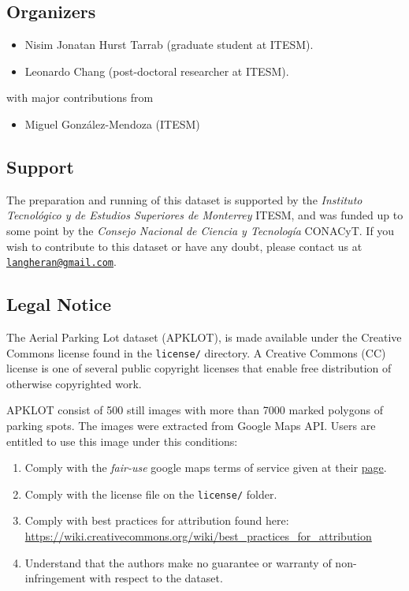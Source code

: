 \documentclass[]{article}
\providecommand{\tightlist}{%
  \setlength{\itemsep}{0pt}\setlength{\parskip}{0pt}}
\theoremstyle{definition}
\theoremstyle{definition}
\theoremstyle{definition}
\theoremstyle{remark}
\begin{document}
\hypertarget{organizers}{%
\subsection{Organizers}\label{organizers}}

\begin{itemize}
\tightlist
\item
  Nisim Jonatan Hurst Tarrab (graduate student at ITESM).
\item
  Leonardo Chang (post-doctoral researcher at ITESM).
\end{itemize}

with major contributions from

\begin{itemize}
\tightlist
\item
  Miguel González-Mendoza (ITESM)
\end{itemize}

\hypertarget{support}{%
\subsection{Support}\label{support}}

The preparation and running of this dataset is supported by the
\emph{Instituto Tecnológico y de Estudios Superiores de Monterrey}
ITESM, and was funded up to some point by the \emph{Consejo Nacional de
Ciencia y Tecnología} CONACyT. If you wish to contribute to this dataset
or have any doubt, please contact us at
\href{mailto:langheran@gmail.com}{\nolinkurl{langheran@gmail.com}}.

\hypertarget{legal-notice}{%
\subsection{Legal Notice}\label{legal-notice}}

The Aerial Parking Lot dataset (APKLOT), is made available under the
Creative Commons license found in the \texttt{license/} directory. A
Creative Commons (CC) license is one of several public copyright
licenses that enable free distribution of otherwise copyrighted work.

APKLOT consist of 500 still images with more than 7000 marked polygons
of parking spots. The images were extracted from Google Maps API. Users
are entitled to use this image under this conditions:

\begin{enumerate}
\def\labelenumi{\arabic{enumi}.}
\tightlist
\item
  Comply with the \emph{fair-use} google maps terms of service given at
  their \href{https://www.google.com/permissions/geoguidelines/}{page}.
\item
  Comply with the license file on the \texttt{license/} folder.
\item
  Comply with best practices for attribution found here:
  \url{https://wiki.creativecommons.org/wiki/best_practices_for_attribution}
\item
  Understand that the authors make no guarantee or warranty of
  non-infringement with respect to the dataset.
\end{enumerate}
\end{document}
